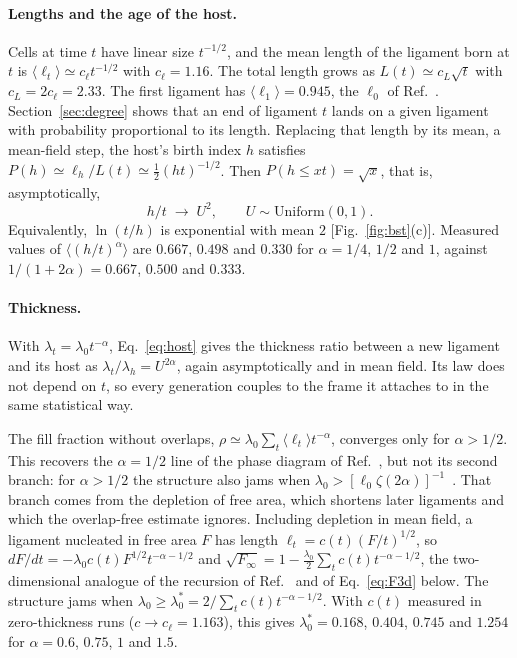 \documentclass[pre,twocolumn,superscriptaddress,amsmath,amssymb,floatfix]{revtex4-2}
\begin{document}
\paragraph*{Lengths and the age of the host.}
Cells at time $t$ have linear size $t^{-1/2}$, and the mean length of the ligament
born at $t$ is $\langle\ell_t\rangle\simeq c_\ell t^{-1/2}$ with $c_\ell=1.16$. The total
length grows as $L(t)\simeq c_L\sqrt t$ with $c_L=2c_\ell=2.33$. The first ligament has
$\langle\ell_1\rangle=0.945$, the $\ell_0$ of Ref.~\cite{both2026}. Section~\ref{sec:degree}
shows that an end of ligament $t$ lands on a given ligament with probability
proportional to its length. Replacing that length by its mean, a mean-field step, the
host's birth index $h$ satisfies $P(h)\simeq\ell_h/L(t)\simeq\tfrac12(ht)^{-1/2}$. Then
$P(h\le xt)=\sqrt x$, that is, asymptotically,
\begin{equation}
  h/t\;\to\;U^2,\qquad U\sim\mathrm{Uniform}(0,1).
  \label{eq:host}
\end{equation}
Equivalently, $\ln(t/h)$ is exponential with mean $2$ [Fig.~\ref{fig:bst}(c)].
Measured values of $\langle(h/t)^\alpha\rangle$ are $0.667$, $0.498$ and $0.330$ for
$\alpha=1/4$, $1/2$ and $1$, against $1/(1+2\alpha)=0.667$, $0.500$ and $0.333$.

\paragraph*{Thickness.}
With $\lambda_t=\lambda_0t^{-\alpha}$, Eq.~\eqref{eq:host} gives the thickness ratio
between a new ligament and its host as $\lambda_t/\lambda_h=U^{2\alpha}$, again
asymptotically and in mean field. Its law does not depend on $t$, so every generation
couples to the frame it attaches to in the same statistical way.

The fill fraction without overlaps,
$\rho\simeq\lambda_0\sum_t\langle\ell_t\rangle t^{-\alpha}$, converges only for
$\alpha>1/2$. This recovers the $\alpha=1/2$ line of the phase diagram of
Ref.~\cite{both2026}, but not its second branch: for $\alpha>1/2$ the structure also
jams when $\lambda_0>[\ell_0\zeta(2\alpha)]^{-1}$~\cite{both2026}. That branch comes from
the depletion of free area, which shortens later ligaments and which the overlap-free
estimate ignores. Including depletion in mean field, a ligament nucleated in free area
$F$ has length $\ell_t=c(t)(F/t)^{1/2}$, so
$dF/dt=-\lambda_0c(t)F^{1/2}t^{-\alpha-1/2}$ and
$\sqrt{F_\infty}=1-\tfrac{\lambda_0}{2}\sum_tc(t)t^{-\alpha-1/2}$, the two-dimensional
analogue of the recursion of Ref.~\cite{both2026} and of Eq.~\eqref{eq:F3d} below. The
structure jams when $\lambda_0\ge\lambda_0^*=2/\sum_tc(t)t^{-\alpha-1/2}$. With $c(t)$
measured in zero-thickness runs ($c\to c_\ell=1.163$), this gives $\lambda_0^*=0.168$,
$0.404$, $0.745$ and $1.254$ for $\alpha=0.6$, $0.75$, $1$ and $1.5$.
\end{document}
